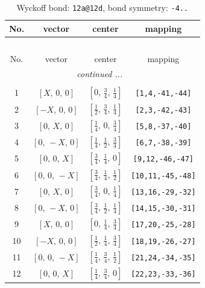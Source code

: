 \documentclass[fleqn,8pt]{jsarticle}
\begin{document}
\begin{longtable}{cccc}
\caption{Wyckoff bond: {\tt 12a@12d}, bond symmetry: {\tt -4..}}
 \\
 \hline \hline
No. & vector & center & mapping \\ \hline \endfirsthead

\multicolumn{3}{l}{\tablename\ \thetable{}} \\
 \hline \hline
No. & vector & center & mapping \\ \hline \endhead

 \hline \hline
\multicolumn{3}{r}{\footnotesize\it continued ...} \\ \endfoot

 \hline \hline
\multicolumn{3}{r}{} \\ \endlastfoot

1 & $\left[ X,\, 0,\, 0 \right]$ & $\left[ 0,\, \frac{3}{4},\, \frac{1}{4} \right]$ & {\tt [1,4,-41,-44]} \\ \hline
2 & $\left[ - X,\, 0,\, 0 \right]$ & $\left[ \frac{1}{2},\, \frac{3}{4},\, \frac{1}{4} \right]$ & {\tt [2,3,-42,-43]} \\ \hline
3 & $\left[ 0,\, X,\, 0 \right]$ & $\left[ \frac{1}{4},\, 0,\, \frac{3}{4} \right]$ & {\tt [5,8,-37,-40]} \\ \hline
4 & $\left[ 0,\, - X,\, 0 \right]$ & $\left[ \frac{1}{4},\, \frac{1}{2},\, \frac{3}{4} \right]$ & {\tt [6,7,-38,-39]} \\ \hline
5 & $\left[ 0,\, 0,\, X \right]$ & $\left[ \frac{3}{4},\, \frac{1}{4},\, 0 \right]$ & {\tt [9,12,-46,-47]} \\ \hline
6 & $\left[ 0,\, 0,\, - X \right]$ & $\left[ \frac{3}{4},\, \frac{1}{4},\, \frac{1}{2} \right]$ & {\tt [10,11,-45,-48]} \\ \hline
7 & $\left[ 0,\, X,\, 0 \right]$ & $\left[ \frac{3}{4},\, 0,\, \frac{1}{4} \right]$ & {\tt [13,16,-29,-32]} \\ \hline
8 & $\left[ 0,\, - X,\, 0 \right]$ & $\left[ \frac{3}{4},\, \frac{1}{2},\, \frac{1}{4} \right]$ & {\tt [14,15,-30,-31]} \\ \hline
9 & $\left[ X,\, 0,\, 0 \right]$ & $\left[ 0,\, \frac{1}{4},\, \frac{3}{4} \right]$ & {\tt [17,20,-25,-28]} \\ \hline
10 & $\left[ - X,\, 0,\, 0 \right]$ & $\left[ \frac{1}{2},\, \frac{1}{4},\, \frac{3}{4} \right]$ & {\tt [18,19,-26,-27]} \\ \hline
11 & $\left[ 0,\, 0,\, - X \right]$ & $\left[ \frac{1}{4},\, \frac{3}{4},\, \frac{1}{2} \right]$ & {\tt [21,24,-34,-35]} \\ \hline
12 & $\left[ 0,\, 0,\, X \right]$ & $\left[ \frac{1}{4},\, \frac{3}{4},\, 0 \right]$ & {\tt [22,23,-33,-36]} \\
\end{longtable}
\end{document}
